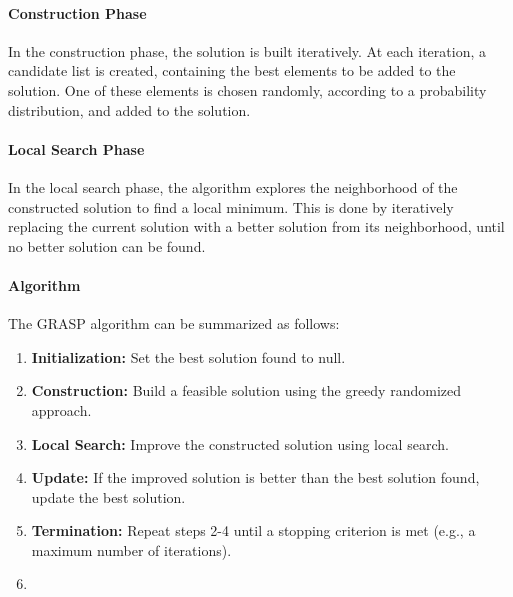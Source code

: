 \documentclass{article}
\begin{document}
\paragraph{Construction Phase}
In the construction phase, the solution is built iteratively. At each iteration, a candidate list is created,
containing the best elements to be added to the solution. One of these elements is chosen randomly, according
to a probability distribution, and added to the solution.

\paragraph{Local Search Phase}
In the local search phase, the algorithm explores the neighborhood of the constructed solution to find a local minimum.
This is done by iteratively replacing the current solution with a better solution from its neighborhood,
until no better solution can be found.

\paragraph{Algorithm}
The GRASP algorithm can be summarized as follows:
\begin{enumerate}
	\item \textbf{Initialization:} Set the best solution found to null.
	\item \textbf{Construction:} Build a feasible solution using the greedy randomized approach.
	\item \textbf{Local Search:} Improve the constructed solution using local search.
	\item \textbf{Update:} If the improved solution is better than the best solution found, update the best solution.
	\item \textbf{Termination:} Repeat steps 2-4 until a stopping criterion is met (e.g., a maximum number of iterations).
    \item 
\end{enumerate}
\end{document}
